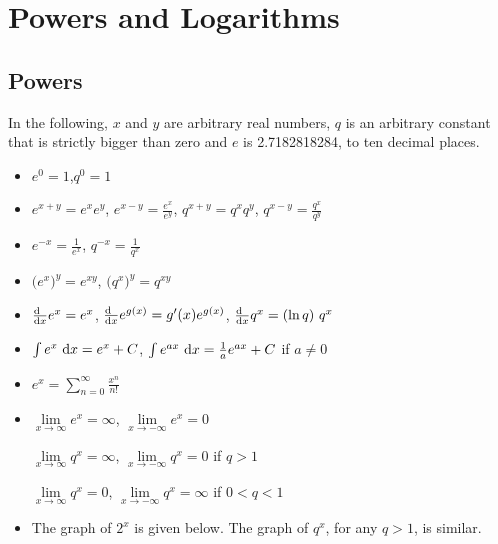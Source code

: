 
\graphicspath{{figures/powerlog/}}
\chapter{Powers and Logarithms}\label{app power log}





\section{Powers}\label{sec powers}
In the following, $x$ and $y$ are arbitrary real numbers,
$q$ is an arbitrary constant that is strictly bigger
than zero and $e$ is 2.7182818284, to ten decimal places.
\begin{itemize}
 \item 
     $e^0=1$,\quad $q^0=1$

\item 
         $e^{x+y}=e^xe^y$,\quad
         $e^{x-y}=\frac{e^x}{e^y}$,\quad
         $q^{x+y}=q^xq^y$,\quad
         $q^{x-y}=\frac{q^x}{q^y}$


\item 
   $e^{-x}=\frac{1}{e^x}$,\quad
   $q^{-x}=\frac{1}{q^x}$

\item 
    $\big(e^x\big)^y=e^{xy}$,\quad
    $\big(q^x\big)^y=q^{xy}$
\item 
    $\diff{\hfill}{x}e^x=e^x$,\quad
    $\diff{\hfill}{x}e^{g(x)}=g'(x)e^{g(x)}$,\quad
    $\diff{\hfill}{x}q^x=(\ln q)\ q^x$
\item
    $\int e^x\ \mathrm{d}x=e^x+C$,\quad
    $\int e^{ax}\ \mathrm{d}x=\frac{1}{a}e^{ax}+C$ if $a\ne 0$
\item
     $e^x =\sum\limits_{n=0}^\infty\frac{x^n}{n!}$
\item    
    $\lim\limits_{x\rightarrow\infty}e^x=\infty$, \quad
    $\lim\limits_{x\rightarrow-\infty}e^x=0$ 

    $\lim\limits_{x\rightarrow\infty}q^x=\infty$, \quad
    $\lim\limits_{x\rightarrow-\infty}q^x=0$ if $q>1$

    $\lim\limits_{x\rightarrow\infty}q^x=0$, \quad
    $\lim\limits_{x\rightarrow-\infty}q^x=\infty$ if $0<q<1$
\item  The graph of $2^x$ is given below. The graph of  $q^x$,
for any $q>1$, is similar.


\end{itemize}
